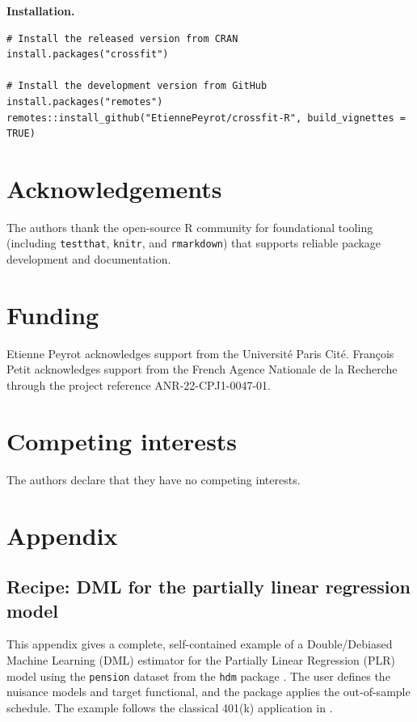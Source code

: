 \textbf{Installation.}

\begin{verbatim}
# Install the released version from CRAN
install.packages("crossfit")

# Install the development version from GitHub
install.packages("remotes")
remotes::install_github("EtiennePeyrot/crossfit-R", build_vignettes = TRUE)
\end{verbatim}

\section*{Acknowledgements}\label{acknowledgements}

The authors thank the open-source R community for foundational tooling (including \texttt{testthat}, \texttt{knitr}, and \texttt{rmarkdown}) that supports reliable package development and documentation.

\section*{Funding}\label{funding}

Etienne Peyrot acknowledges support from the Université Paris Cité. François Petit acknowledges support from the French Agence Nationale de la Recherche through the project reference ANR-22-CPJ1-0047-01.

\section*{Competing interests}\label{competing-interests}

The authors declare that they have no competing interests.

\section*{Appendix}\label{appendix}

\subsection{Recipe: DML for the partially linear regression model}\label{app:plr-pension}

This appendix gives a complete, self-contained example of a Double/Debiased Machine Learning (DML) estimator for the Partially Linear Regression (PLR) model using the \texttt{pension} dataset from the \texttt{hdm} package \citep{hdm}. The user defines the nuisance models and target functional, and the package applies the out-of-sample schedule. The example follows the classical 401(k) application in \citep{chernozhukov2018}.

